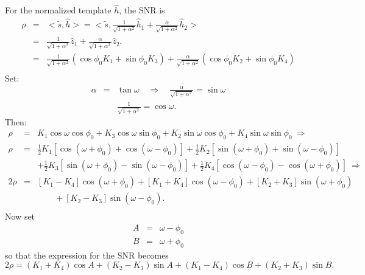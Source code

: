 For the normalized template $\hat{h}$, the SNR is
\begin{eqnarray}
\rho &=& <\tilde{s},\hat{h}> = <\tilde{s}, \frac{1}{\sqrt{1+\alpha^2}}
\hat{h}_1 + \frac{\alpha}
{\sqrt{1+\alpha^2}} \hat{h}_2 > \\
    &=& \frac{1}{\sqrt{1+\alpha^2}} \hat{z}_1 + \frac{\alpha}
{\sqrt{1+\alpha^2}} \hat{z}_2 .\\
    &=& \frac{1}{\sqrt{1+\alpha^2}} (\cos\phi_0 K_1 + \sin\phi_0 K_3) +
 \frac{\alpha}{\sqrt{1+\alpha^2}} (\cos\phi_0 K_2 + \sin\phi_0 K_4) \\
\end{eqnarray}
Set:
\begin{eqnarray}
\alpha &=&\tan\omega \quad \Rightarrow \quad \frac{\alpha}{\sqrt{1+\alpha^2}} =
\sin\omega \\
    && \frac{1}{\sqrt{1+\alpha^2}} = \cos\omega.
\end{eqnarray}
Then:
\begin{eqnarray}
\rho &=& K_1 \cos\omega \cos\phi_0 + K_3 \cos\omega \sin\phi_0 + K_2 \sin\omega
\cos\phi_0 + K_4 \sin\omega \sin\phi_0 \: \Rightarrow \\
\rho &=& \frac{1}{2} K_1 [\cos(\omega+\phi_0) + \cos(\omega-\phi_0)] +
    \frac{1}{2} K_2 [\sin(\omega+\phi_0) + \sin(\omega-\phi_0)]  \\
&& +\frac{1}{2} K_3 [\sin(\omega+\phi_0) - \sin(\omega-\phi_0)] +
    \frac{1}{2} K_4 [\cos(\omega-\phi_0) - \cos(\omega+\phi_0)] \:
\Rightarrow \\
2 \rho &=& [K_1 - K_4] \cos(\omega+\phi_0) + [K_1+K_4] \cos(\omega-\phi_0) +
    [K_2+K_3] \sin(\omega+\phi_0)  \\
    && \quad \quad + [K_2-K_3] \sin(\omega-\phi_0). \\
\end{eqnarray}
Now set
\begin{eqnarray}
\label{OmegaMinusPhi}
A &=& \omega - \phi_0 \\
B &=& \omega + \phi_0 \label{OmegaPlusPhi}
\end{eqnarray}
so that the expression for the SNR becomes
\begin{equation}
2 \rho = (K_1+K_4) \cos A + (K_2-K_3) \sin A + (K_1-K_4) \cos B + (K_2+K_3)
\sin B.
\label{MaxSNR}
\end{equation}

